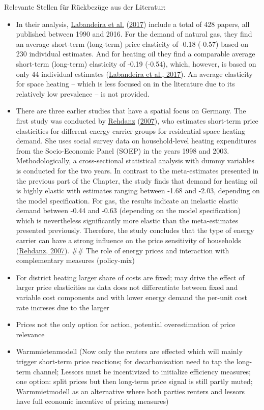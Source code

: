 \documentclass[12pt,twoside]{reedthesis}
\begin{document}
Relevante Stellen für Rückbezüge aus der Literatur:
\begin{itemize}
\item
  In their analysis, \protect\hyperlink{ref-labandeira_etal17}{Labandeira et al.} (\protect\hyperlink{ref-labandeira_etal17}{2017}) include a total of 428 papers, all published between 1990 and 2016. For the demand of natural gas, they find an average short-term (long-term) price elasticity of -0.18 (-0.57) based on 230 individual estimates. And for heating oil they find a comparable average short-term (long-term) elasticity of -0.19 (-0.54), which, however, is based on only 44 individual estimates (\protect\hyperlink{ref-labandeira_etal17}{Labandeira et al., 2017}). An average elasticity for space heating -- which is less focused on in the literature due to its relatively low prevalence -- is not provided.
\item
  There are three earlier studies that have a spatial focus on Germany. The first study was conducted by \protect\hyperlink{ref-rehdanz07}{Rehdanz} (\protect\hyperlink{ref-rehdanz07}{2007}), who estimates short-term price elasticities for different energy carrier groups for residential space heating demand. She uses social survey data on household-level heating expenditures from the Socio-Economic Panel (SOEP) in the years 1998 and 2003. Methodologically, a cross-sectional statistical analysis with dummy variables is conducted for the two years. In contrast to the meta-estimates presented in the previous part of the Chapter, the study finds that demand for heating oil is highly elastic with estimates ranging between -1.68 and -2.03, depending on the model specification. For gas, the results indicate an inelastic elastic demand between -0.44 and -0.63 (depending on the model specification) which is nevertheless significantly more elastic than the meta-estimates presented previously. Therefore, the study concludes that the type of energy carrier can have a strong influence on the price sensitivity of households (\protect\hyperlink{ref-rehdanz07}{Rehdanz, 2007}).
  \#\# The role of energy prices and interaction with complementary measures (policy-mix)
\item
  For district heating larger share of costs are fixed; may drive the effect of larger price elasticities as data does not differentiate between fixed and variable cost components and with lower energy demand the per-unit cost rate increses due to the larger
\item
  Prices not the only option for action, potential overestimation of price relevance
\item
  Warmmietenmodell (Now only the renters are effected which will mainly trigger short-term price reactions; for decarbonisation need to tap the long-term channel; Lessors must be incentivized to initialize efficiency measures; one option: split prices but then long-term price signal is still partly muted; Warmmietmodell as an alternative where both parties renters and lessors have full economic incentive of pricing measures)
\end{itemize}
\end{document}
